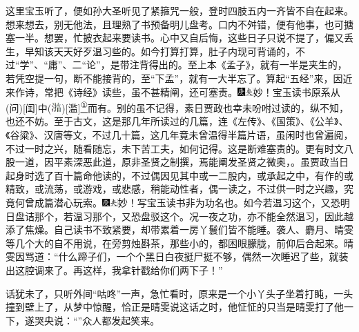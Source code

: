 这里宝玉听了，便如孙大圣听见了紧箍咒一般，登时四肢五内一齐皆不自在起来。想来想去，别无他法，且理熟了书预备明儿盘考。口内不舛错，便有他事，也可搪塞一半。想罢，忙披衣起来要读书。心中又自后悔，这些日子只说不提了，偏又丢生，早知该天天好歹温习些的。如今打算打算，肚子内现可背诵的，不过``学''、``庸''、二``论''，是带注背得出的。至上本《孟子》，就有一半是夹生的，若凭空提一句，断不能接背的，至``下孟''，就有一大半忘了。算起``五经''来，因近来作诗，常把《诗经》读些，虽不甚精阐，还可塞责。{\includegraphics[width=3mm]{../Images/00004}\includegraphics[width=3mm]{../Images/00012}\footnotesize \kaishu 妙！宝玉读书原系从{(问)}{[}闺{]}中{(\includegraphics[width=4mm]{../images/00030})}{[}滥{]}}\href{../Text/part0077_split_000.html\#lnkback_1_a}{\textsuperscript{①}}{而有。}别的虽不记得，素日贾政也幸未吩咐过读的，纵不知，也还不妨。至于古文，这是那几年所读过的几篇，连《左传》、《国策》、《公羊》、《谷粱》、汉唐等文，不过几十篇，这几年竟未曾温得半篇片语，虽闲时也曾遍阅，不过一时之兴，随看随忘，未下苦工夫，如何记得。这是断难塞责的。更有时文八股一道，因平素深恶此道，原非圣贤之制撰，焉能阐发圣贤之微奥，。虽贾政当日起身时选了百十篇命他读的，不过偶因见其中或一二股内，或承起之中，有作的或精致，或流荡，或游戏，或悲感，稍能动性者，偶一读之，不过供一时之兴趣，究竟何曾成篇潜心玩索。{\includegraphics[width=3mm]{../Images/00004}\includegraphics[width=3mm]{../Images/00012}\footnotesize \kaishu 妙！写宝玉读书非为功名也。}如今若温习这个，又恐明日盘诘那个，若温习那个，又恐盘驳这个。况一夜之功，亦不能全然温习，因此越添了焦燥。自己读书不致紧要，却带累着一房丫鬟们皆不能睡。袭人、麝月、晴雯等几个大的自不用说，在旁剪烛斟茶，那些小的，都困眼朦胧，前仰后合起来。晴雯因骂道：``什么蹄子们，一个个黑日白夜挺尸挺不够，偶然一次睡迟了些，就装出这腔调来了。再这样，我拿针戳给你们两下子！''

话犹未了，只听外间``咕咚''一声，急忙看时，原来是一个小丫头子坐着打盹，一头撞到壁上了，从梦中惊醒，恰正是晴雯说这话之时，他怔怔的只当是晴雯打了他一下，遂哭央说：``''众人都发起笑来。


